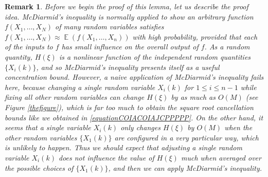 \documentclass[dvipsnames,letterpaper,12pt]{article}
\numberwithin{equation}{section}
\newtheorem{remark}[theorem]{Remark}
\numberwithin{theorem}{section}
\DeclareMathOperator{\EE}{\mathbb{E}}
\begin{document}
\begin{remark}
    Before we begin the proof of this lemma, let us describe the proof idea. McDiarmid's inequality is normally applied to show an arbitrary function $f(X_1,\dots,X_N)$ of many random variables satisfies $f(X_1,\dots,X_N) \approx \EE(f(X_1,\dots,X_n))$ with high probability, provided that each of the inputs to $f$ has small influence on the overall output of $f$. As a random quantity, $H(\xi)$ is a nonlinear function of the independent random quantities $\{ X_i(k) \}$, and so McDiarmid's inequality presents itself as a useful concentration bound. However, a naive application of McDiarmid's inequality fails here, because changing a single random variable $X_i(k)$ for $1 \leq i \leq n-1$ while fixing all other random variables can change $H(\xi)$ by as much as $O(M)$ (see Figure \ref{thefigure}), which is far too much to obtain the square root cancellation bounds like we obtained in \eqref{equationCOIACOIAJCPPPPP}. On the other hand, it seems that a single variable $X_i(k)$ only changes $H(\xi)$ by $O(M)$ when the other random variables $\{ X_1(k) \}$ are configured in a very particular way, which is unlikely to happen. Thus we should expect that adjusting a single random variable $X_i(k)$ does not influence the value of $H(\xi)$ much when \emph{averaged} over the possible choices of $\{ X_1(k) \}$, and then we can apply McDiarmid's inequality.
\end{remark}
\end{document}
